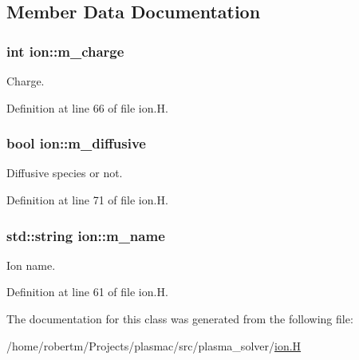 \subsection{Member Data Documentation}
\subsubsection[{\texorpdfstring{m\+\_\+charge}{m_charge}}]{\setlength{\rightskip}{0pt plus 5cm}int ion\+::m\+\_\+charge\hspace{0.3cm}{\ttfamily [protected]}}\hypertarget{classion_ad1b2bff942b774400f0ad2e41f5cc118}{}\label{classion_ad1b2bff942b774400f0ad2e41f5cc118}


Charge. 



Definition at line 66 of file ion.\+H.

\subsubsection[{\texorpdfstring{m\+\_\+diffusive}{m_diffusive}}]{\setlength{\rightskip}{0pt plus 5cm}bool ion\+::m\+\_\+diffusive\hspace{0.3cm}{\ttfamily [protected]}}\hypertarget{classion_a45d87675332227c92456b24c19c4d781}{}\label{classion_a45d87675332227c92456b24c19c4d781}


Diffusive species or not. 



Definition at line 71 of file ion.\+H.

\subsubsection[{\texorpdfstring{m\+\_\+name}{m_name}}]{\setlength{\rightskip}{0pt plus 5cm}std\+::string ion\+::m\+\_\+name\hspace{0.3cm}{\ttfamily [protected]}}\hypertarget{classion_a768ee32274571c46880883d7abc0abcd}{}\label{classion_a768ee32274571c46880883d7abc0abcd}


Ion name. 



Definition at line 61 of file ion.\+H.



The documentation for this class was generated from the following file\+:\begin{DoxyCompactItemize}
\item 
/home/robertm/\+Projects/plasmac/src/plasma\+\_\+solver/\hyperlink{ion_8H}{ion.\+H}\end{DoxyCompactItemize}
